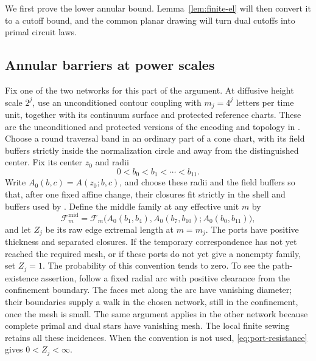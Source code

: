 We first prove the lower annular bound.  Lemma~\ref{lem:finite-el} will
then convert it to a cutoff bound, and the common planar drawing will turn
dual cutoffs into primal circuit laws.

\subsection{Annular barriers at power scales}

Fix one of the two networks for this part of the argument.  At diffusive
height scale \(2^j\), use an unconditioned contour coupling with
\(m_j=4^j\) letters per time unit, together with its continuum surface and
protected reference charts.  These are the unconditioned and protected
versions of the encoding and topology in \cite[Sections~3--5]{C}.
Choose a round traversal band in an ordinary part of a cone chart, with its
field buffers strictly inside the normalization circle and away from the
distinguished center.  Fix its center
\(z_0\) and radii
\[
 0<b_0<b_1<\cdots<b_{11}.
\]
Write \(A_0(b,c)=A(z_0;b,c)\), and choose these radii and the field buffers
so that, after one fixed affine change, their closures fit strictly in the
shell and buffers used by \cite[Theorem~6.4]{C}.  Define the middle family
at any effective unit \(m\) by
\[
 \mathcal F_m^{\mathrm{mid}}
 =\mathcal F_m\bigl(A_0(b_1,b_4),A_0(b_7,b_{10});
                         A_0(b_0,b_{11})\bigr),
\]
and let \(Z_j\) be its raw edge extremal length at \(m=m_j\).
The ports have positive thickness and separated closures.  If the
temporary correspondence has not yet reached the required mesh, or if
these ports do not yet give a nonempty family, set \(Z_j=1\).  The
probability of this convention tends to zero.  To see the path-existence
assertion, follow a fixed radial arc with positive clearance from the
confinement boundary.  The faces met along the arc have vanishing diameter;
their boundaries supply a walk in the chosen network, still in the
confinement, once the mesh is small.  The same argument applies in the
other network because complete primal and dual stars have vanishing mesh.
The local finite sewing retains all these incidences.  When the convention
is not used, \eqref{eq:port-resistance} gives \(0<Z_j<\infty\).

